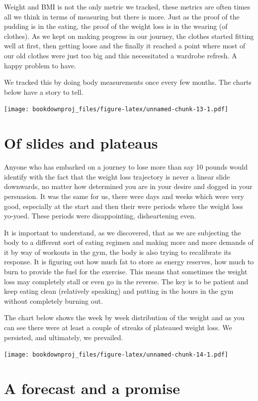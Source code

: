 \documentclass[
  oneside]{book}
\begin{document}
Weight and BMI is not the only metric we tracked, these metrics are often times all we think in terms of measuring but there is more. Just as the proof of the pudding is in the eating, the proof of the weight loss is in the wearing (of clothes). As we kept on making progress in our journey, the clothes started fitting well at first, then getting loose and the finally it reached a point where most of our old clothes were just too big and this necessitated a wardrobe refresh. A happy problem to have.

We tracked this by doing body measurements once every few months. The charts below have a story to tell.

\texttt{[image: bookdownproj\_files/figure-latex/unnamed-chunk-13-1.pdf]}

\hypertarget{of-slides-and-plateaus}{%
\section{Of slides and plateaus}\label{of-slides-and-plateaus}}

Anyone who has embarked on a journey to lose more than say 10 pounds would identify with the fact that the weight loss trajectory is never a linear slide downwards, no matter how determined you are in your desire and dogged in your persuasion. It was the same for us, there were days and weeks which were very good, especially at the start and then their were periods where the weight loss yo-yoed. These periods were disappointing, disheartening even.

It is important to understand, as we discovered, that as we are subjecting the body to a different sort of eating regimen and making more and more demands of it by way of workouts in the gym, the body is also trying to recalibrate its response. It is figuring out how much fat to store as energy reserves, how much to burn to provide the fuel for the exercise. This means that sometimes the weight loss may completely stall or even go in the reverse. The key is to be patient and keep eating clean (relatively speaking) and putting in the hours in the gym without completely burning out.

The chart below shows the week by week distribution of the weight and as you can see there were at least a couple of streaks of plateaued weight loss. We persisted, and ultimately, we prevailed.

\texttt{[image: bookdownproj\_files/figure-latex/unnamed-chunk-14-1.pdf]}

\hypertarget{a-forecast-and-a-promise}{%
\section{A forecast and a promise}\label{a-forecast-and-a-promise}}
\end{document}
